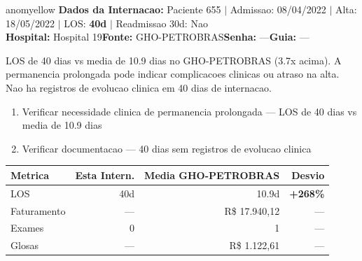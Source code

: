\documentclass[a4paper,10pt]{article}
\begin{document}
\begin{anomalycard}[Internacao 277 | GHO-PETROBRAS | MODERADO (z=2.11)]{anomyellow}
\textbf{Dados da Internacao:} Paciente 655 $\mid$ Admissao: 08/04/2022 $\mid$ Alta: 18/05/2022 $\mid$ LOS: \textbf{40d} $\mid$ Readmissao 30d: Nao\\
\textbf{Hospital:} Hospital 19\quad\textbf{Fonte:} GHO-PETROBRAS\quad\textbf{Senha:} ---\quad\textbf{Guia:} ---\\
\vspace{2pt}\begin{tcolorbox}[colback=severityred!20,colframe=anomyellow,title={\textbf{Interpretacao de Negocio}},fonttitle=\bfseries\small,left=4pt,right=4pt,top=3pt,bottom=3pt]
{\small LOS de 40 dias vs media de 10.9 dias no GHO-PETROBRAS (3.7x acima). A permanencia prolongada pode indicar complicacoes clinicas ou atraso na alta. Nao ha registros de evolucao clinica em 40 dias de internacao.}
\end{tcolorbox}
\begin{tcolorbox}[colback=severityyellow!30,colframe=anomorange,title={\textbf{Recomendacoes Especificas}},fonttitle=\bfseries\small,left=4pt,right=4pt,top=3pt,bottom=3pt]
\begin{enumerate}[nosep,leftmargin=16pt]
\item {\small Verificar necessidade clinica de permanencia prolongada --- LOS de 40 dias vs media de 10.9 dias}
\item {\small Verificar documentacao --- 40 dias sem registros de evolucao clinica}
\end{enumerate}
\end{tcolorbox}
\begin{center}\begin{tabular}{l r r r}\toprule\textbf{Metrica} & \textbf{Esta Intern.} & \textbf{Media GHO-PETROBRAS} & \textbf{Desvio} \\\midrule
LOS & 40d & 10.9d & \textcolor{anomred}{\textbf{+268\%}} \\
Faturamento & --- & R\$ 17.940,12 & --- \\
Exames & 0 & 1 & --- \\
Glosas & --- & R\$ 1.122,61 & --- \\
\bottomrule\end{tabular}\end{center}


\end{anomalycard}
\end{document}
